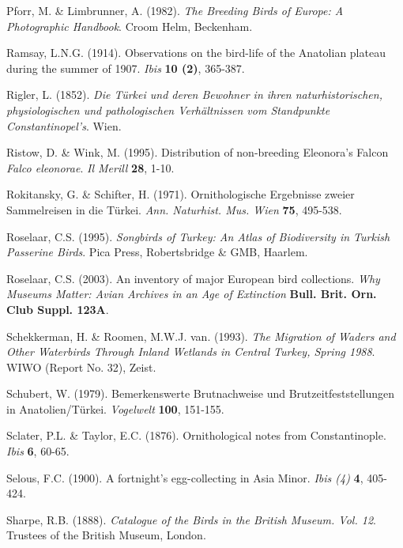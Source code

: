 \documentclass[
  10.5pt,
  a4paper,
  DIV=11,
  numbers=noendperiod,
  twocolumn]{scrreprt}
\newlength{\cslhangindent}
\newenvironment{CSLReferences}[2] %
 {\begin{list}{}{%
  \setlength{\itemindent}{0pt}
  \setlength{\leftmargin}{0pt}
  \setlength{\parsep}{0pt}
  \ifodd #1
   \setlength{\leftmargin}{\cslhangindent}
   \setlength{\itemindent}{-1\cslhangindent}
  \fi
  \setlength{\itemsep}{#2\baselineskip}}}
 {\end{list}}
\begin{document}
\begin{CSLReferences}{1}{1}
Pforr, M. \& Limbrunner, A. (1982). \emph{{The Breeding Birds of Europe:
A Photographic Handbook}}. Croom Helm, Beckenham.

Ramsay, L.N.G. (1914). {Observations on the bird-life of the Anatolian
plateau during the summer of 1907}. \emph{Ibis} \textbf{10 (2)},
365-387.

Rigler, L. (1852). \emph{{Die Türkei und deren Bewohner in ihren
naturhistorischen, physiologischen und pathologischen Verhältnissen vom
Standpunkte Constantinopel's}}. Wien.

Ristow, D. \& Wink, M. (1995). {Distribution of non-breeding Eleonora's
Falcon \emph{Falco eleonorae}}. \emph{Il Merill} \textbf{28}, 1-10.

Rokitansky, G. \& Schifter, H. (1971). {Ornithologische Ergebnisse
zweier Sammelreisen in die Türkei}. \emph{Ann. Naturhist. Mus. Wien}
\textbf{75}, 495-538.

Roselaar, C.S. (1995). \emph{{Songbirds of Turkey: An Atlas of
Biodiversity in Turkish Passerine Birds}}. Pica Press, Robertsbridge \&
GMB, Haarlem.

Roselaar, C.S. (2003). {An inventory of major European bird
collections}. \emph{Why Museums Matter: Avian Archives in an Age of
Extinction} \textbf{Bull. Brit. Orn. Club Suppl. 123A}.

Schekkerman, H. \& Roomen, M.W.J. van. (1993). \emph{{The Migration of
Waders and Other Waterbirds Through Inland Wetlands in Central Turkey,
Spring 1988}}. WIWO (Report No. 32), Zeist.

Schubert, W. (1979). {Bemerkenswerte Brutnachweise und
Brutzeitfeststellungen in Anatolien/Türkei}. \emph{Vogelwelt}
\textbf{100}, 151-155.

Sclater, P.L. \& Taylor, E.C. (1876). {Ornithological notes from
Constantinople}. \emph{Ibis} \textbf{6}, 60-65.

Selous, F.C. (1900). {A fortnight's egg-collecting in Asia Minor}.
\emph{Ibis (4)} \textbf{4}, 405-424.

Sharpe, R.B. (1888). \emph{{Catalogue of the Birds in the British
Museum. Vol. 12}}. Trustees of the British Museum, London.


\end{CSLReferences}
\end{document}
